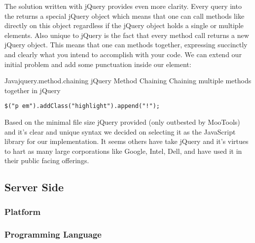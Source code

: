 The solution written with jQuery provides even more clarity.
Every query into the  returns a special jQuery object which means
that one can call methods like  directly on this object
regardless if the jQuery object holds a single or multiple elements.
Also unique to jQuery is the fact that every method call returns a new jQuery
object. This means that one can  methods together, expressing
succinctly and clearly what you intend to accomplish with your code. We can
extend our initial problem and add some punctuation inside our 
element:

\begin{scode}{Java}{jquery.method.chaining}{%
  jQuery Method Chaining}{%
  Chaining multiple methods together in jQuery}
\begin{lstlisting}
$("p em").addClass("highlight").append("!");
\end{lstlisting}
\end{scode}

Based on the minimal file size jQuery provided (only outbested by MooTools)
and it's clear and unique syntax we decided on selecting it as the JavaScript
library for our implementation. It seems others have take jQuery and it's
virtues to hart as many large corporations like Google, Intel, Dell, and
 have used it in their public facing offerings.%

\subsection{Server Side}

\subsubsection{Platform}

\subsubsection{Programming Language}
\label{section:selection.stack.server.language}

